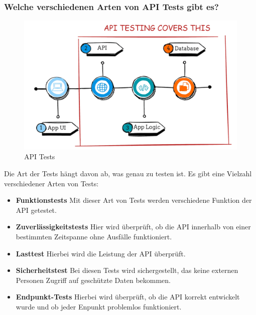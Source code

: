 \subsubsection{Welche verschiedenen Arten von API Tests gibt es?}

\begin{figure}[h!]
    \centering
    \includegraphics[width=0.8\linewidth]{pics/api-tests.png}
    \caption{API Tests}
    \label{fig:enter-label}
\end{figure}


Die Art der Tests hängt davon ab, was genau zu testen ist. Es gibt eine Vielzahl verschiedener Arten von Tests:
\begin{itemize}
    \item \textbf{Funktionstests}
        \newline
        Mit dieser Art von Tests werden verschiedene Funktion der API getestet.
    \item \textbf{Zuverlässigkeitstests}
        \newline
        Hier wird überprüft, ob die API innerhalb von einer bestimmten Zeitspanne ohne Ausfälle funktioniert.
    \item \textbf{Lasttest}
        \newline
        Hierbei wird die Leistung der API überprüft. 
    \item \textbf{Sicherheitstest}
        \newline
        Bei diesen Tests wird sichergestellt, das keine externen Personen Zugriff auf geschützte Daten bekommen.
    \item \textbf{Endpunkt-Tests}
        \newline
        Hierbei wird überprüft, ob die API korrekt entwickelt wurde und ob jeder Enpunkt problemlos funktioniert.
\end{itemize}



